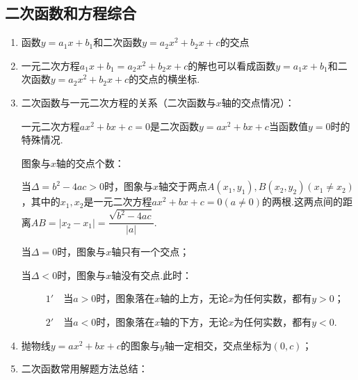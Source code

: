\documentclass[10pt]{ctexart}
\newcommand{\abs}[1]{\left| #1 \right|}
\begin{document}
\subsection{二次函数和方程综合}
\begin{enumerate}
\item 函数$y=a_1x+b_1$和二次函数$y=a_2x^2+b_2x+c$的交点
\begin{enumerate}[(1)]


\end{enumerate}
\item 一元二次方程$a_1x+b_1=a_2x^2+b_2x+c$的解也可以看成函数$y=a_1x+b_1$和二次函数$y=a_2x^2+b_2x+c$的交点的横坐标.
\item 二次函数与一元二次方程的关系（二次函数与$x$轴的交点情况）：

\begin{shaded}
一元二次方程$ax^2+bx+c=0$是二次函数$y=ax^2+bx+c$当函数值$y=0$时的特殊情况.

图象与$x$轴的交点个数：

当$\Delta=b^2-4ac>0$时，图象与$x$轴交于两点$A(x_1,y_1),B(x_2,y_2)(x_1\neq x_2)$，其中的$x_1,x_2$是一元二次方程$ax^2+bx+c=0(a\neq 0)$的两根.这两点间的距离$AB=\abs{x_2-x_1}=\dfrac{\sqrt{b^2-4ac}}{\abs{a}}$.

当$\Delta=0$时，图象与$x$轴只有一个交点；

当$\Delta<0$时，图象与$x$轴没有交点.此时：

~~~~~$1'$~~当$a>0$时，图象落在$x$轴的上方，无论$x$为任何实数，都有$y>0$；

~~~~~$2'$~~当$a<0$时，图象落在$x$轴的下方，无论$x$为任何实数，都有$y<0$.
\end{shaded}
\item 抛物线$y=ax^2+bx+c$的图象与$y$轴一定相交，交点坐标为$(0,c)$；
\item 二次函数常用解题方法总结：
\begin{enumerate}[(1)]


\end{enumerate}
\end{enumerate}
\end{document}
